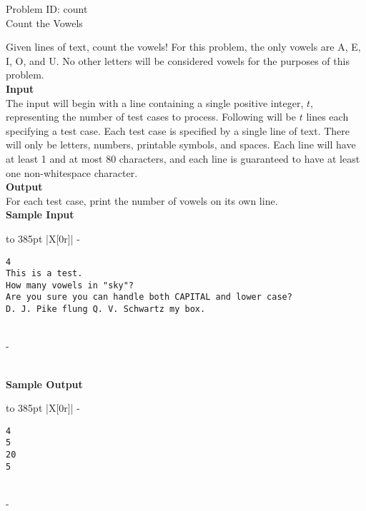 \documentclass[a4paper,11pt]{article}
\begin{document}
\begin{center}
   {\Huge Problem ID: count}\vspace{2 mm} \\			%
   {\huge Count the Vowels}\vspace{2 mm} \\		%
\end{center}
Given lines of text, count the vowels! For this problem, the only vowels are A, E, I, O, and U. No other letters will be considered vowels for the purposes of this problem.
\vspace{7mm}\\
\large{\bf{Input}}\vspace{2mm}\\
The input will begin with a line containing a single positive integer, $t$, representing the number of test cases to process. Following will be $t$ lines each specifying a test case. Each test case is specified by a single line of text. There will only be letters, numbers, printable symbols, and spaces. Each line will have at least 1 and at most 80 characters, and each line is guaranteed to have at least one non-whitespace character.
\vspace{3mm}\\
\large{\bf{Output}}\vspace{2mm}\\
For each test case, print the number of vowels on its own line.
\vspace{5mm}\\
\bf{Sample Input} \vspace{1mm}\\
\begin{tabu*} to 385pt {|X[0r]|}
\tabucline-
\vspace{-\baselineskip} %
\begin{Verbatim}
4
This is a test.
How many vowels in "sky"?
Are you sure you can handle both CAPITAL and lower case?
D. J. Pike flung Q. V. Schwartz my box.
\end{Verbatim}
\\
\tabucline-
\end{tabu*}
\vspace{5mm}\\
\bf{Sample Output} \vspace{1mm}\\
\begin{tabu*} to 385pt {|X[0r]|}
\tabucline-
\vspace{-\baselineskip} %
\begin{Verbatim}
4
5
20
5
\end{Verbatim}
\\
\tabucline-
\end{tabu*}
\end{document}
